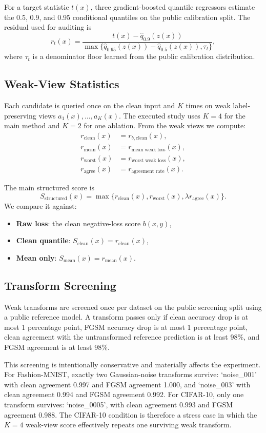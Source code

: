\documentclass{article}
\newcommand{\rclean}{r_{\mathrm{clean}}}
\newcommand{\rmean}{r_{\mathrm{mean}}}
\newcommand{\rworst}{r_{\mathrm{worst}}}
\newcommand{\ragree}{r_{\mathrm{agree}}}
\begin{document}
For a target statistic \(t(x)\), three gradient-boosted quantile regressors estimate the 0.5, 0.9, and 0.95 conditional quantiles on the public calibration split. The residual used for auditing is
\[
r_t(x) = \frac{t(x) - \widehat{q}_{0.9}(z(x))}{\max\{\widehat{q}_{0.95}(z(x)) - \widehat{q}_{0.5}(z(x)), \tau_t\}},
\]
where \(\tau_t\) is a denominator floor learned from the public calibration distribution.

\subsection{Weak-View Statistics}
Each candidate is queried once on the clean input and \(K\) times on weak label-preserving views \(a_1(x),\dots,a_K(x)\). The executed study uses \(K=4\) for the main method and \(K=2\) for one ablation. From the weak views we compute:
\begin{align*}
\rclean(x) &= r_{b,\mathrm{clean}}(x), \\
\rmean(x) &= r_{\text{mean weak loss}}(x), \\
\rworst(x) &= r_{\text{worst weak loss}}(x), \\
\ragree(x) &= r_{\text{agreement rate}}(x).
\end{align*}

The main structured score is
\[
S_{\mathrm{structured}}(x) = \max\{\rclean(x), \rworst(x), \lambda \ragree(x)\}.
\]
We compare it against:
\begin{itemize}[leftmargin=*,topsep=2pt,itemsep=2pt]
    \item \textbf{Raw loss}: the clean negative-loss score \(b(x,y)\),
    \item \textbf{Clean quantile}: \(S_{\mathrm{clean}}(x)=\rclean(x)\),
    \item \textbf{Mean only}: \(S_{\mathrm{mean}}(x)=\rmean(x)\).
\end{itemize}

\subsection{Transform Screening}
Weak transforms are screened once per dataset on the public screening split using a public reference model. A transform passes only if clean accuracy drop is at most 1 percentage point, FGSM accuracy drop is at most 1 percentage point, clean agreement with the untransformed reference prediction is at least 98\%, and FGSM agreement is at least 98\%.

This screening is intentionally conservative and materially affects the experiment. For Fashion-MNIST, exactly two Gaussian-noise transforms survive: `noise\_001' with clean agreement 0.997 and FGSM agreement 1.000, and `noise\_003' with clean agreement 0.994 and FGSM agreement 0.992. For CIFAR-10, only one transform survives: `noise\_0005', with clean agreement 0.993 and FGSM agreement 0.988. The CIFAR-10 condition is therefore a stress case in which the \(K=4\) weak-view score effectively repeats one surviving weak transform.
\end{document}
